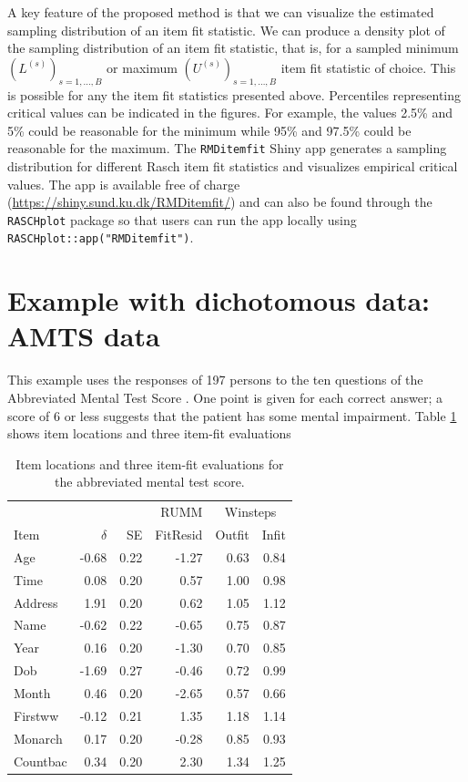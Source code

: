 \documentclass[11pt,a4paper]{article}
\begin{document}
A key feature of the proposed method is that we can visualize the estimated sampling distribution of an item fit statistic. We can produce a density plot of the sampling distribution of an item fit statistic, that is, for a sampled minimum $(L^{(s)})_{s=1,\ldots,B}$ or maximum $(U^{(s)})_{s=1,\ldots,B}$ item fit statistic of choice. This is possible for any the item fit statistics presented above. Percentiles representing critical values can be indicated in the figures. For example, the values 2.5\% and 5\% could be reasonable for the minimum while 95\% and 97.5\% could be reasonable for the maximum. The \texttt{RMDitemfit} Shiny app generates a sampling distribution for different Rasch item fit statistics and visualizes empirical critical values. The app is available free of charge (\url{https://shiny.sund.ku.dk/RMDitemfit/}) and can also be found through the \texttt{RASCHplot} package so that users can run the app locally using \texttt{RASCHplot::app("RMDitemfit")}.


\section{Example with dichotomous data: AMTS data}

This example uses the responses of 197 persons to the ten questions of the Abbreviated Mental Test Score \cite[AMTS]{hodkinson72}. One point is given for each correct answer; a score of 6 or less suggests that the patient has some mental impairment. Table \ref{tab:amtsfit} shows item locations and three item-fit evaluations

\begin{table}[h!]
    \centering
    \caption{Item locations and three item-fit evaluations for the abbreviated mental test score.} \label{tab:amtsfit}
    \begin{tabular}{lrrrrr}
    \\
    \toprule
             &          &    & RUMM     & \multicolumn{2}{c}{Winsteps}\\
    Item     & $\delta$ & SE & FitResid & Outfit & Infit\\
    \midrule
    Age      & -0.68 & 0.22 & -1.27 & 0.63 & 0.84 \\
    Time     &  0.08 & 0.20 &  0.57 & 1.00 & 0.98 \\
    Address  &  1.91 & 0.20 &  0.62 & 1.05 & 1.12 \\
    Name     & -0.62 & 0.22 & -0.65 & 0.75 & 0.87 \\
    Year     &  0.16 & 0.20 & -1.30 & 0.70 & 0.85 \\
    Dob      & -1.69 & 0.27 & -0.46 & 0.72 & 0.99 \\
    Month    &  0.46 & 0.20 & -2.65 & 0.57 & 0.66 \\
    Firstww  & -0.12 & 0.21 &  1.35 & 1.18 & 1.14 \\
    Monarch  &  0.17 & 0.20 & -0.28 & 0.85 & 0.93 \\
    Countbac &  0.34 & 0.20 &  2.30 & 1.34 & 1.25 \\
    \bottomrule
    \end{tabular}
\end{table}
\end{document}

